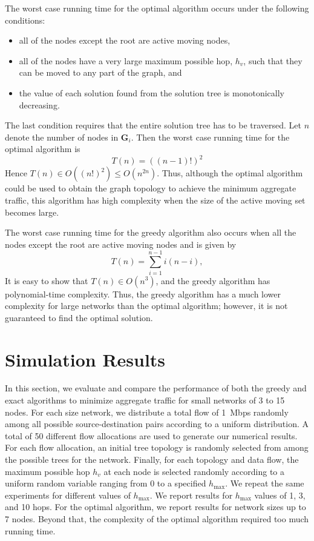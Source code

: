 \documentclass[10pt,conference]{IEEEtran}
\begin{document}
The worst case running time for the optimal algorithm occurs under the
following conditions:
\begin{itemize}
\item all of the nodes except the root are active moving nodes,
\item all of the nodes have a very large maximum possible hop,
  $h_{v}$, such that they can be moved to any part of the graph, and
\item the value of each solution found from the solution tree is
  monotonically decreasing.
\end{itemize}
The last condition requires that the entire solution tree has to be
traversed.  Let $n$ denote the number of nodes in $\mathbf{G}_i$.
Then the worst case running time for the optimal algorithm is
\begin{equation}
\label{eq:time_2} T(n) = ((n - 1)!)^2
\end{equation}
Hence $T(n) \in O((n!)^2) \le O(n^{2n})$.  Thus, although the optimal
algorithm could be used to obtain the graph topology to
achieve the minimum aggregate traffic, this algorithm
has high complexity when the size of the active moving set becomes large.

The worst case running time for the greedy algorithm also occurs when all the
nodes except the root are active moving nodes  and is given by
\begin{equation}
\label{eq:time_1} T(n) = \sum_{i = 1}^{n -1 }i(n-i),
\end{equation}
It is easy to show that $T(n) \in O(n^3)$, and the greedy algorithm has
polynomial-time complexity.  Thus, the greedy algorithm has a much
lower complexity for large networks than the optimal algorithm;
however, it is not guaranteed to find the optimal solution.




\section{Simulation Results}
\label{sec:sim_result}

In this section, we evaluate and compare the performance of both the
greedy and exact algorithms to minimize aggregate traffic for small
networks of 3 to 15 nodes. For each size network, we distribute a
total flow of 1~Mbps randomly among all possible source-destination
pairs according to a uniform distribution.  A total of 50 different
flow allocations are used to generate our numerical results.  For each
flow allocation, an initial tree topology is randomly selected from
among the possible trees for the network.  Finally, for each topology
and data flow, the maximum possible hop $h_{v}$ at each node is
selected randomly according to a uniform random variable ranging from
0 to a specified $h_{\max}$.  We repeat the same experiments for
different values of $h_{\max}$.  We report results for $h_{\max}$
values of 1, 3, and 10 hops.  For the optimal algorithm, we report
results for network sizes up to 7 nodes.  Beyond that, the complexity
of the optimal algorithm required too much running time.
\end{document}

